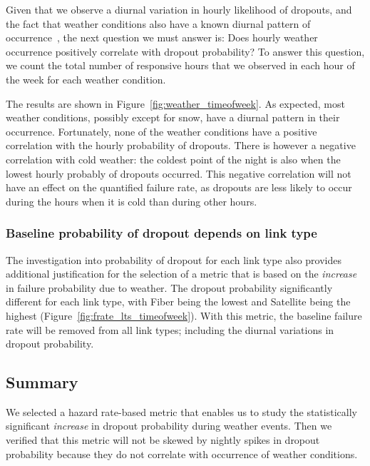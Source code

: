 Given that we observe a diurnal variation in hourly likelihood of dropouts, and
the fact that weather conditions also have a known diurnal pattern of
occurrence~\cite{diurnal-weather}, the next question we must answer is: Does
hourly weather occurrence positively correlate with dropout probability?
%
To answer this question, we count the total number of responsive hours that we
observed in each hour of the week for each weather condition.

The results are shown in Figure~\ref{fig:weather_timeofweek}.
%
As expected, most weather conditions, possibly except for snow, have a diurnal
pattern in their occurrence.
%
Fortunately, none of the weather conditions have a positive correlation with
the hourly probability of dropouts.
%
There is however a negative correlation with cold weather: the coldest point of
the night is also when the lowest hourly probably of dropouts occurred.
%
This negative correlation will not have an effect on the quantified failure
rate, as dropouts are less likely to occur during the hours when it is cold
than during other hours.

\subsubsection*{Baseline probability of dropout depends on link type}

The investigation into probability of dropout for each link type also provides
additional justification for the selection of a metric that is based on the
\emph{increase} in failure probability due to weather.
%
The dropout probability significantly different for each link type, with Fiber
being the lowest and Satellite being the highest
(Figure~\ref{fig:frate_lts_timeofweek}).
%
With this metric, the baseline failure rate will be removed from all link
types; including the diurnal variations in dropout probability.

\subsection{Summary}

We selected a hazard rate-based metric that enables us to study the
statistically significant \emph{increase} in dropout probability during weather
events.
%
Then we verified that this metric will not be skewed by nightly spikes in
dropout probability because they do not correlate with occurrence of weather
conditions.
